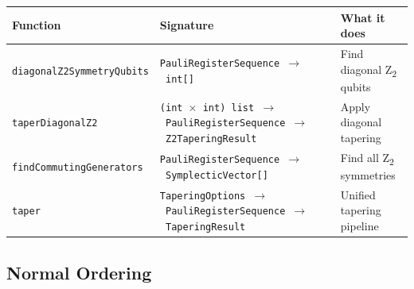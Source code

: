 \documentclass[
  11pt,
  oneside]{book}
\begin{document}
\begin{longtable}[]{@{}
  >{\raggedright\arraybackslash}p{}
  >{\raggedright\arraybackslash}p{}
  >{\raggedright\arraybackslash}p{}@{}}
\toprule\noalign{}
\begin{minipage}[b]{\linewidth}\raggedright
Function
\end{minipage} & \begin{minipage}[b]{\linewidth}\raggedright
Signature
\end{minipage} & \begin{minipage}[b]{\linewidth}\raggedright
What it does
\end{minipage} \\
\midrule\noalign{}
\endhead
\bottomrule\noalign{}
\endlastfoot
\texttt{diagonalZ2SymmetryQubits} &
\texttt{PauliRegisterSequence\ $\rightarrow$\ int{[}{]}} & Find diagonal Z\textsubscript{2}
qubits \\
\texttt{taperDiagonalZ2} &
\texttt{(int\ $\times$\ int)\ list\ $\rightarrow$\ PauliRegisterSequence\ $\rightarrow$\ Z2TaperingResult}
& Apply diagonal tapering \\
\texttt{findCommutingGenerators} &
\texttt{PauliRegisterSequence\ $\rightarrow$\ SymplecticVector{[}{]}} & Find all Z\textsubscript{2}
symmetries \\
\texttt{taper} &
\texttt{TaperingOptions\ $\rightarrow$\ PauliRegisterSequence\ $\rightarrow$\ TaperingResult} &
Unified tapering pipeline \\
\end{longtable}

\subsection{Normal Ordering}\label{normal-ordering}
\end{document}
